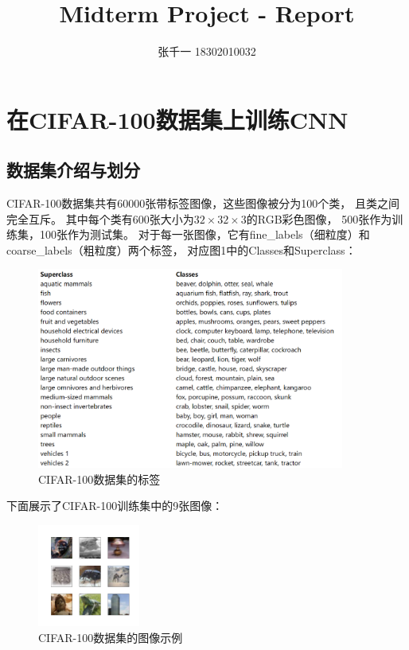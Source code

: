 \documentclass[UTF8]{ctexart}
\title{Midterm Project - Report}
\author{张千一 18302010032}
\begin{document}
\maketitle

\tableofcontents

\newpage
\section{在CIFAR-100数据集上训练CNN}
\label{sec: CNN}
\subsection{数据集介绍与划分}
CIFAR-100数据集共有60000张带标签图像，这些图像被分为100个类，
且类之间完全互斥。
其中每个类有600张大小为$32\times32\times3$的RGB彩色图像，
500张作为训练集，100张作为测试集。
对于每一张图像，它有fine\_labels（细粒度）和coarse\_labels（粗粒度）两个标签，
对应图1中的Classes和Superclass：

\begin{figure}[htbp]
    \centering
    \includegraphics[width=0.90\textwidth]{../img/cifar100-classes.png}
    \caption{CIFAR-100数据集的标签}
\end{figure}

下面展示了CIFAR-100训练集中的9张图像：

\begin{figure}[htbp]
    \centering
    \includegraphics[width=0.30\textwidth]{../img/cifar100.png}
    \caption{CIFAR-100数据集的图像示例}
\end{figure}
\end{document}
